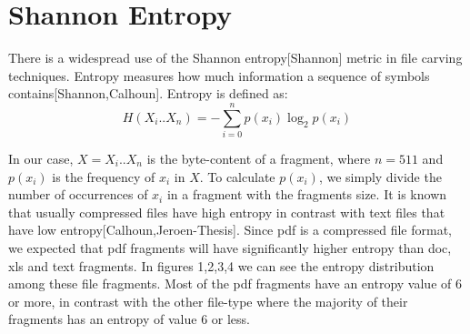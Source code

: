\section{Shannon Entropy}
There is a widespread use of the Shannon entropy[Shannon] metric in file carving techniques. Entropy measures how much information a sequence of symbols contains[Shannon,Calhoun]. Entropy is defined as:
 \begin{displaymath}
 H({X_i}..{X_n})=-\sum_{i=0}^{n}{p({x_i})}\log_2{p({x_i})}
\end{displaymath} 

In our case, $X={X_i}..{X_n}$  is the byte-content of a fragment, where $n=511$  and $p({x_i})$ is the frequency of ${x_i}$ in ${X}$. To calculate $p({x_i})$, we simply divide the number of occurrences of ${x_i}$ in a fragment with the fragments size. It is known that usually compressed files have high entropy in contrast with text files that have low entropy[Calhoun,Jeroen-Thesis]. Since pdf is a compressed file format, we expected that pdf fragments will have significantly higher entropy than doc, xls and text fragments. In figures 1,2,3,4 we can see the entropy distribution among these file fragments. Most of the pdf fragments have an entropy value of 6 or more, in contrast with the other file-type  where the majority of their fragments has an entropy of value 6 or less.

